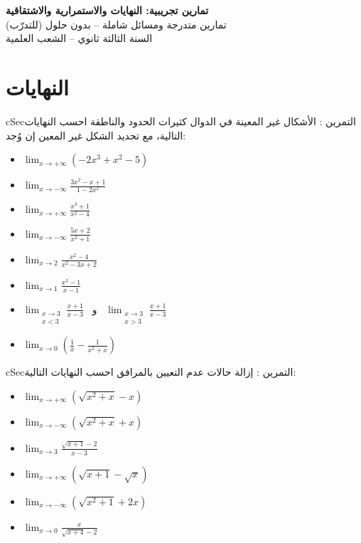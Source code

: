 \documentclass[12pt,a4paper]{article}
\newenvironment{BOX}[2]{\begin{otherlanguage}{english}\begin{arbox}{#1}{#2}}{\end{arbox}\end{otherlanguage}}
\newcounter{exo}
\newenvironment{tamrin}[1]{\stepcounter{exo}\begin{BOX}{cSec}{التمرين \theexo: #1}}{\end{BOX}}
\newenvironment{LTR}{\begin{otherlanguage}{english}}{\end{otherlanguage}}
\newenvironment{sq}{\begin{itemize}[leftmargin=2.4em,itemsep=3pt]}{\end{itemize}}
\newcommand{\qa}{\item[(أ)]}\newcommand{\qb}{\item[(ب)]}\newcommand{\qc}{\item[(جـ)]}\newcommand{\qd}{\item[(د)]}\newcommand{\qe}{\item[(هـ)]}
\begin{document}
\begin{LTR}
\begin{tcolorbox}[enhanced,colback=cSec,colframe=cSec,arc=3mm,halign=center,boxrule=0pt,top=12pt,bottom=12pt,before upper={\selectlanguage{arabic}}]
{\color{white}\fontsize{22}{30}\selectfont\bfseries تمارين تجريبية: النهايات والاستمرارية والاشتقاقية}\\[8pt]
{\color{white}\large تمارين متدرجة ومسائل شاملة -- بدون حلول (للتدرّب)}\\[5pt]
{\color{white}\large السنة الثالثة ثانوي -- الشعب العلمية}
\end{tcolorbox}
\end{LTR}
\section{النهايات}
\begin{tamrin}{الأشكال غير المعينة في الدوال كثيرات الحدود والناطقة}
احسب النهايات التالية، مع تحديد الشكل غير المعين إن وُجد:
\begin{sq}
\qa $\displaystyle\lim_{x\to+\infty}\left(-2x^{3}+x^{2}-5\right)$
\qb $\displaystyle\lim_{x\to-\infty}\frac{3x^{2}-x+1}{1-2x^{2}}$
\qc $\displaystyle\lim_{x\to+\infty}\frac{x^{3}+1}{x^{2}-4}$
\qd $\displaystyle\lim_{x\to-\infty}\frac{5x+2}{x^{2}+1}$
\qe $\displaystyle\lim_{x\to2}\frac{x^{2}-4}{x^{2}-3x+2}$
\item[(و)] $\displaystyle\lim_{x\to1}\frac{x^{3}-1}{x-1}$
\item[(ز)] $\displaystyle\lim_{\substack{x\to3\\ x<3}}\frac{x+1}{x-3}$ \ و \ $\displaystyle\lim_{\substack{x\to3\\ x>3}}\frac{x+1}{x-3}$
\item[(ح)] $\displaystyle\lim_{x\to0}\left(\frac{1}{x}-\frac{1}{x^{2}+x}\right)$
\end{sq}
\end{tamrin}

\begin{tamrin}{إزالة حالات عدم التعيين بالمرافق}
احسب النهايات التالية:
\begin{sq}
\qa $\displaystyle\lim_{x\to+\infty}\left(\sqrt{x^{2}+x}-x\right)$
\qb $\displaystyle\lim_{x\to-\infty}\left(\sqrt{x^{2}+x}+x\right)$
\qc $\displaystyle\lim_{x\to3}\frac{\sqrt{x+1}-2}{x-3}$
\qd $\displaystyle\lim_{x\to+\infty}\left(\sqrt{x+1}-\sqrt{x}\right)$
\qe $\displaystyle\lim_{x\to-\infty}\left(\sqrt{x^{2}+1}+2x\right)$
\item[(و)] $\displaystyle\lim_{x\to0}\frac{x}{\sqrt{x+4}-2}$
\end{sq}
\end{tamrin}
\end{document}
